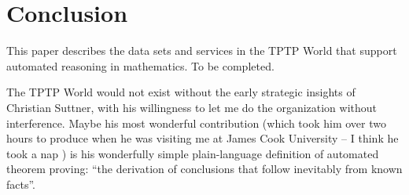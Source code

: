 \documentclass[runningheads]{llncs}
\begin{document}
\section{Conclusion}
\label{Conclusion}

This paper describes the data sets and services in the TPTP World that support automated reasoning 
in mathematics.
To be completed.

The TPTP World would not exist without the early strategic insights of Christian Suttner,
with his willingness to let me do the organization without interference. 
Maybe his most wonderful contribution (which took him over two hours to produce when he
was visiting me at James Cook University -- I think he took a nap \smiley) is his 
wonderfully simple plain-language definition of automated theorem proving: 
``the derivation of conclusions that follow inevitably from known facts''.



\end{document}
